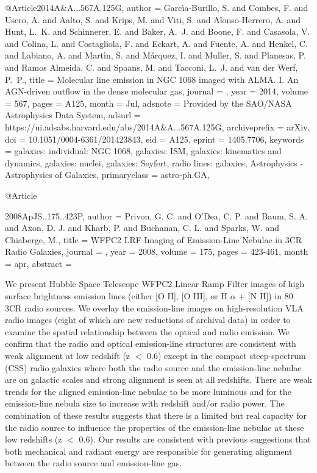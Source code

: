 \documentclass[longauth]{aa}
\begin{document}
{{{{{{{{{@Article{2014A&A...567A.125G,
  author        = {{Garc{\'\i}a-Burillo}, S. and {Combes}, F. and {Usero}, A. and {Aalto}, S. and {Krips}, M. and {Viti}, S. and {Alonso-Herrero}, A. and {Hunt}, L.~K. and {Schinnerer}, E. and {Baker}, A.~J. and {Boone}, F. and {Casasola}, V. and {Colina}, L. and {Costagliola}, F. and {Eckart}, A. and {Fuente}, A. and {Henkel}, C. and {Labiano}, A. and {Mart{\'\i}n}, S. and {M{\'a}rquez}, I. and {Muller}, S. and {Planesas}, P. and {Ramos Almeida}, C. and {Spaans}, M. and {Tacconi}, L.~J. and {van der Werf}, P.~P.},
  title         = {Molecular line emission in NGC 1068 imaged with ALMA. I. An AGN-driven outflow in the dense molecular gas},
  journal       = {\aap},
  year          = {2014},
  volume        = {567},
  pages         = {A125},
  month         = {Jul},
  adsnote       = {Provided by the SAO/NASA Astrophysics Data System},
  adsurl        = {https://ui.adsabs.harvard.edu/abs/2014A&A...567A.125G},
  archiveprefix = {arXiv},
  doi           = {10.1051/0004-6361/201423843},
  eid           = {A125},
  eprint        = {1405.7706},
  keywords      = {galaxies: individual: NGC 1068, galaxies: ISM, galaxies: kinematics and dynamics, galaxies: nuclei, galaxies: Seyfert, radio lines: galaxies, Astrophysics - Astrophysics of Galaxies},
  primaryclass  = {astro-ph.GA},
}

@Article{2008ApJS..175..423P,
  author        = {Privon, G. C. and O'Dea, C. P. and Baum, S. A. and Axon, D. J. and Kharb, P. and Buchanan, C. L. and Sparks, W. and Chiaberge, M.},
  title         = {WFPC2 LRF Imaging of Emission-Line Nebulae in 3CR Radio Galaxies},
  journal       = {\apjs},
  year          = {2008},
  volume        = {175},
  pages         = {423-461},
  month         = apr,
  abstract      = {We present Hubble Space Telescope WFPC2 Linear Ramp Filter images of
high surface brightness emission lines (either [O II], [O III], or  H
{$\alpha$} + [N II]) in 80 3CR radio sources. We overlay the emission-line
images on high-resolution VLA radio images (eight of which are new
reductions of archival data) in order to examine the spatial
relationship between the optical and radio emission. We confirm that the
radio and optical emission-line structures are consistent with weak
alignment at low redshift (z $\lt$ 0.6) except in the compact
steep-spectrum (CSS) radio galaxies where both the radio source and the
emission-line nebulae are on galactic scales and strong alignment is
seen at all redshifts. There are weak trends for the aligned
emission-line nebulae to be more luminous and for the emission-line
nebula size to increase with redshift and/or radio power. The
combination of these results suggests that there is a limited but real
capacity for the radio source to influence the properties of the
emission-line nebulae at these low redshifts (z $\lt$ 0.6). Our results
are consistent with previous suggestions that both mechanical and
radiant energy are responsible for generating alignment between the
radio source and emission-line gas.

}}}}}}}}}}}
\end{document}
